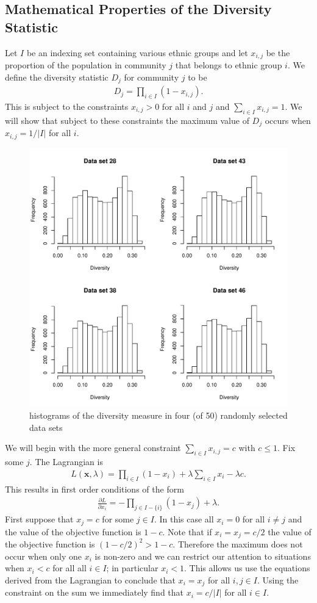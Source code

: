 \documentclass{article}
\begin{document}
 \subsection{Mathematical Properties of the Diversity Statistic}
 Let $I$ be an indexing set containing various ethnic groups and let $x_{i,j}$ be the proportion of the population in community $j$ that belongs to ethnic group $i$.  We define the diversity statistic $D_j$ for community $j$ to be 
\begin{align*}
D_j = \prod_{i \in I}(1-x_{i,j}).
\end{align*}
This is subject to the constraints $x_{i,j}>0$ for all $i$ and $j$ and $\sum_{i \in I}x_{i,j}=1$.  We will show that subject to these constraints the maximum value of $D_j$ occurs when $x_{i,j} = 1/|I|$ for all $i$.  
\begin{figure}[t]
\begin{center}
 \includegraphics[width = .75\textwidth]{graphics/diver4hists.pdf}
\end{center}
\caption{histograms of the diversity measure in four (of 50) randomly selected data sets \label{4hists}}
\end{figure}
We will begin with the more general constraint $\sum_{i \in I} x_{i,j} = c$ with $c \leq 1$.  Fix some $j$.  The Lagrangian is
\begin{align*}
 L(\boldsymbol{x}, \lambda) = \prod_{i \in I}(1-x_i) +\lambda \sum_{i \in I}x_i - \lambda c.
 \end{align*}
This results in first order conditions of the form
\begin{align*}
\frac{\partial L}{\partial x_i} = -\prod_{j \in I-\{i\}}(1-x_j) + \lambda.
\end{align*}
First suppose that $x_j = c$ for some $j \in I$.  In this case all $x_i = 0$ for all $i \neq j$ and the value of the objective function is $1 - c$.  Note that if $x_i=x_j=c/2$ the value of the objective function is $(1-c/2)^2 > 1-c$.  Therefore the maximum does not occur when only one $x_i$ is non-zero and we can restrict our attention to situations when $x_i < c$ for all all $i \in I$; in particular $x_i < 1$.  This allows us use the equations derived from the Lagrangian to conclude that $x_i = x_j$ for all $i,j \in I$.  Using the constraint on the sum we immediately find that $x_i = c/|I|$ for all $i \in I$.  
\end{document}
